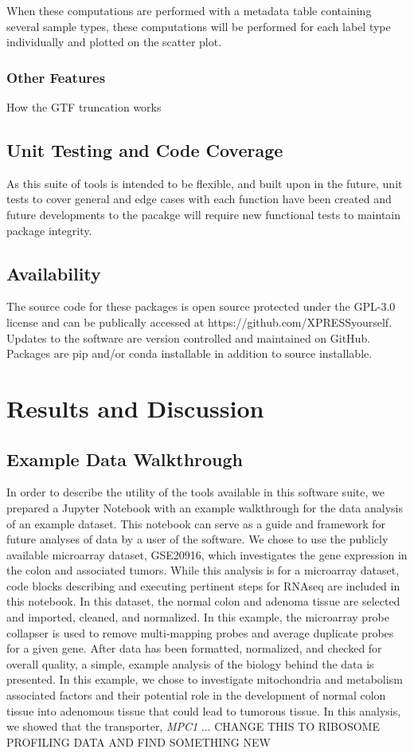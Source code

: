 \documentclass[11pt, a4paper, oneside]{article}
\begin{document}
When these computations are performed with a metadata table containing several sample types, these computations will be performed for each label type individually and plotted on the scatter plot.

\subsubsection{Other Features}
How the GTF truncation works

\subsection{Unit Testing and Code Coverage}
As this suite of tools is intended to be flexible, and built upon in the future, unit tests to cover general and edge cases with each function have been created and future developments to the pacakge will require new functional tests to maintain package integrity.

\subsection{Availability}
The source code for these packages is open source protected under the GPL-3.0 license and can be publically accessed at https://github.com/XPRESSyourself. Updates to the software are version controlled and maintained on GitHub. Packages are pip and/or conda installable in addition to source installable.

\section*{Results and Discussion}

\subsection{Example Data Walkthrough}
In order to describe the utility of the tools available in this software suite, we prepared a Jupyter Notebook with an example walkthrough for the data analysis of an example dataset. This notebook can serve as a guide and framework for future analyses of data by a user of the software. We chose to use the publicly available microarray dataset, GSE20916, which investigates the gene expression in the colon and associated tumors. While this analysis is for a microarray dataset, code blocks describing and executing pertinent steps for RNAseq are included in this notebook. In this dataset, the normal colon and adenoma tissue are selected and imported, cleaned, and normalized. In this example, the microarray probe collapser is used to remove multi-mapping probes and average duplicate probes for a given gene. After data has been formatted, normalized, and checked for overall quality, a simple, example analysis of the biology behind the data is presented. In this example, we chose to investigate mitochondria and metabolism associated factors and their potential role in the development of normal colon tissue into adenomous tissue that could lead to tumorous tissue. In this analysis, we showed that the transporter, \textit{MPC1} ...
{CHANGE THIS TO RIBOSOME PROFILING DATA AND FIND SOMETHING NEW}
\end{document}
